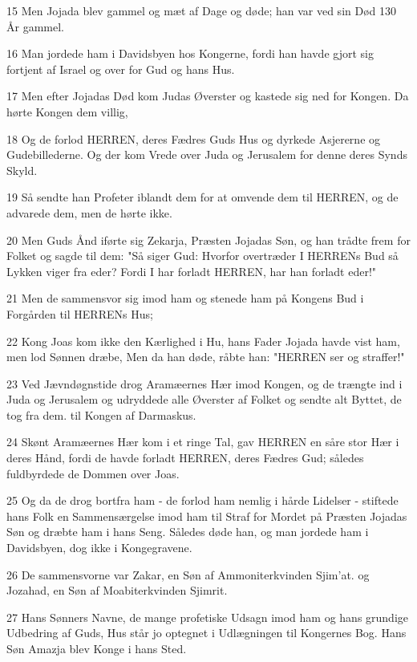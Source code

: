 \par 15 Men Jojada blev gammel og mæt af Dage og døde; han var ved sin Død 130 År gammel.
\par 16 Man jordede ham i Davidsbyen hos Kongerne, fordi han havde gjort sig fortjent af Israel og over for Gud og hans Hus.
\par 17 Men efter Jojadas Død kom Judas Øverster og kastede sig ned for Kongen. Da hørte Kongen dem villig,
\par 18 Og de forlod HERREN, deres Fædres Guds Hus og dyrkede Asjererne og Gudebillederne. Og der kom Vrede over Juda og Jerusalem for denne deres Synds Skyld.
\par 19 Så sendte han Profeter iblandt dem for at omvende dem til HERREN, og de advarede dem, men de hørte ikke.
\par 20 Men Guds Ånd iførte sig Zekarja, Præsten Jojadas Søn, og han trådte frem for Folket og sagde til dem: "Så siger Gud: Hvorfor overtræder I HERRENs Bud så Lykken viger fra eder? Fordi I har forladt HERREN, har han forladt eder!"
\par 21 Men de sammensvor sig imod ham og stenede ham på Kongens Bud i Forgården til HERRENs Hus;
\par 22 Kong Joas kom ikke den Kærlighed i Hu, hans Fader Jojada havde vist ham, men lod Sønnen dræbe, Men da han døde, råbte han: "HERREN ser og straffer!"
\par 23 Ved Jævndøgnstide drog Aramæernes Hær imod Kongen, og de trængte ind i Juda og Jerusalem og udryddede alle Øverster af Folket og sendte alt Byttet, de tog fra dem. til Kongen af Darmaskus.
\par 24 Skønt Aramæernes Hær kom i et ringe Tal, gav HERREN en såre stor Hær i deres Hånd, fordi de havde forladt HERREN, deres Fædres Gud; således fuldbyrdede de Dommen over Joas.
\par 25 Og da de drog bortfra ham - de forlod ham nemlig i hårde Lidelser - stiftede hans Folk en Sammensærgelse imod ham til Straf for Mordet på Præsten Jojadas Søn og dræbte ham i hans Seng. Således døde han, og man jordede ham i Davidsbyen, dog ikke i Kongegravene.
\par 26 De sammensvorne var Zakar, en Søn af Ammoniterkvinden Sjim'at. og Jozahad, en Søn af Moabiterkvinden Sjimrit.
\par 27 Hans Sønners Navne, de mange profetiske Udsagn imod ham og hans grundige Udbedring af Guds, Hus står jo optegnet i Udlægningen til Kongernes Bog. Hans Søn Amazja blev Konge i hans Sted.

